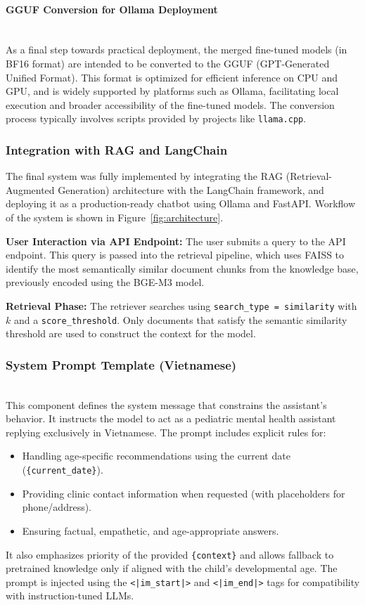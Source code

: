 \documentclass[runningheads]{llncs}
\begin{document}
\paragraph{GGUF Conversion for Ollama Deployment}\mbox{}\\
\label{sec:gguf_conversion}As a final step towards practical deployment, the merged fine-tuned models (in BF16 format) are intended to be converted to the GGUF (GPT-Generated Unified Format). This format is optimized for efficient inference on CPU and GPU, and is widely supported by platforms such as Ollama, facilitating local execution and broader accessibility of the fine-tuned models. The conversion process typically involves scripts provided by projects like \texttt{llama.cpp}.

\subsubsection{Integration with RAG and LangChain}

The final system was fully implemented by integrating the RAG (Retrieval-Augmented Generation) architecture with the LangChain framework, and deploying it as a production-ready chatbot using Ollama and FastAPI. Workflow of the system is shown in Figure~\ref{fig:architecture}.

\noindent\textbf{User Interaction via API Endpoint:}
The user submits a query to the API endpoint. This query is passed into the retrieval pipeline, which uses FAISS to identify the most semantically similar document chunks from the knowledge base, previously encoded using the BGE-M3 model.

\noindent\textbf{Retrieval Phase:}
The retriever searches using \texttt{search\_type = similarity} with $k$ and a \texttt{score\_threshold}. Only documents that satisfy the semantic similarity threshold are used to construct the context for the model.

\subsubsection*{System Prompt Template (Vietnamese)}\mbox{}\\

This component defines the system message that constrains the assistant’s behavior. It instructs the model to act as a pediatric mental health assistant replying exclusively in Vietnamese. The prompt includes explicit rules for:
\begin{itemize}
    \item Handling age-specific recommendations using the current date (\texttt{\{current\_date\}}).
    \item Providing clinic contact information when requested (with placeholders for phone/address).
    \item Ensuring factual, empathetic, and age-appropriate answers.
\end{itemize}
It also emphasizes priority of the provided \texttt{\{context\}} and allows fallback to pretrained knowledge only if aligned with the child’s developmental age. The prompt is injected using the \texttt{<|im\_start|>} and \texttt{<|im\_end|>} tags for compatibility with instruction-tuned LLMs.
\end{document}
